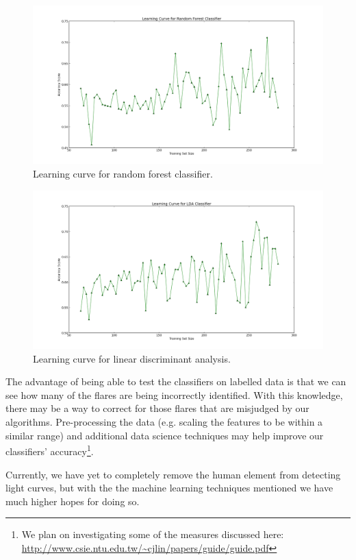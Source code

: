 \documentclass[11pt]{article}
\begin{document}
\begin{figure}[h!]
  \caption{Learning curve for random forest classifier.}
  \label{fig:lc_rf}
  \centering
    \includegraphics[width=\textwidth]{learncurve_randfor}
\end{figure}

\begin{figure}[h!]
  \caption{Learning curve for linear discriminant analysis.}
  \label{fig:lc_lda}
  \centering
    \includegraphics[width=\textwidth]{learncurve_lda}
\end{figure}

The advantage of being able to test the classifiers on labelled data
is that we can see how many of the flares are being incorrectly
identified.  With this knowledge, there may be a way to correct for
those flares that are misjudged by our algorithms.  Pre-processing the
data (e.g. scaling the features to be within a similar range) and
additional data science techniques may help improve our classifiers'
accuracy\footnote{We plan on investigating some of the measures
  discussed here:
  \url{http://www.csie.ntu.edu.tw/~cjlin/papers/guide/guide.pdf}}.

Currently, we have yet to completely remove the human element from
detecting light curves, but with the the machine learning techniques
mentioned we have much higher hopes for doing so.
\end{document}
